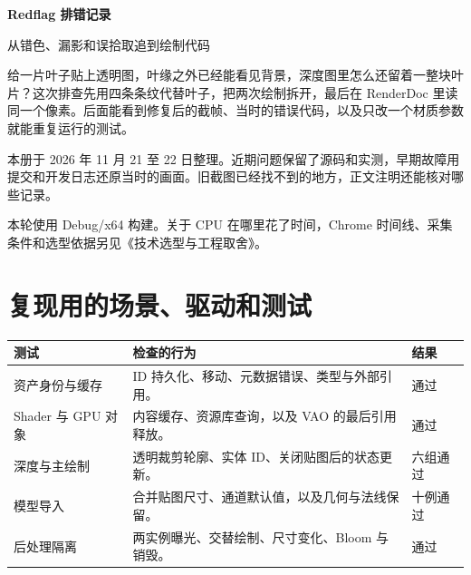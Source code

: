 
\usepackage{amsmath}
\usepackage{fvextra}
\usepackage{pgfplots}
\pgfplotsset{compat=1.18}
\newcommand{\loc}[1]{\par{\footnotesize\color{muted}源码：\path{#1}}\par}
\renewcommand{\note}[1]{\par{\small\color{muted}#1\par}}
\setlength{\emergencystretch}{1em}

\raggedright
\setlength{\parindent}{2\ccwd}
{\Huge\bfseries Redflag 排错记录}\par\vspace{5pt}
{\Large\color{muted}从错色、漏影和误拾取追到绘制代码}\par
{}

给一片叶子贴上透明图，叶缘之外已经能看见背景，深度图里怎么还留着一整块叶片？这次排查先用四条条纹代替叶子，把两次绘制拆开，最后在 RenderDoc 里读同一个像素。后面能看到修复后的截帧、当时的错误代码，以及只改一个材质参数就能重复运行的测试。

本册于 2026 年 11 月 21 至 22 日整理。近期问题保留了源码和实测，早期故障用提交和开发日志还原当时的画面。旧截图已经找不到的地方，正文注明还能核对哪些记录。

本轮使用 Debug/x64 构建。关于 CPU 在哪里花了时间，Chrome 时间线、采集条件和选型依据另见《技术选型与工程取舍》。

\section{复现用的场景、驱动和测试}
\noindent\begin{tabularx}{\textwidth}{L{3.2cm}YL{2cm}}
\toprule
测试 & 检查的行为 & 结果 \\
\midrule
资产身份与缓存 & ID 持久化、移动、元数据错误、类型与外部引用。 & 通过 \\
Shader 与 GPU 对象 & 内容缓存、资源库查询，以及 VAO 的最后引用释放。 & 通过 \\
深度与主绘制 & 透明裁剪轮廓、实体 ID、关闭贴图后的状态更新。 & 六组通过 \\
模型导入 & 合并贴图尺寸、通道默认值，以及几何与法线保留。 & 十例通过 \\
后处理隔离 & 两实例曝光、交替绘制、尺寸变化、Bloom 与销毁。 & 通过 \\
\bottomrule
\end{tabularx}

